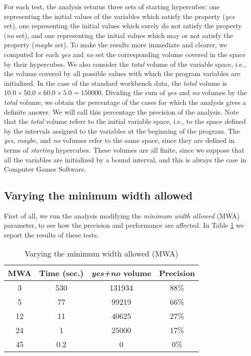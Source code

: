 For each test, the analysis returns three sets of starting hypercubes: one representing the initial values of the variables which satisfy the property (\textit{yes} set), one representing the initial values which surely do not satisfy the property (\textit{no} set), and one representing the initial values which may or not satisfy the property (\textit{maybe} set). To make the results more immediate and clearer, we computed for each \emph{yes} and \emph{no} set the corresponding volume covered in the space by their hypercubes. We also consider the \emph{total} volume of the variable space, i.e., the volume covered by all possible values with which the program variables are initialized. In the case of the standard workbench data, the \emph{total} volume is $10.0 \times 50.0 \times 60.0 \times 5.0 = 150000$. Dividing the sum of \emph{yes} and \emph{no} volumes by the \emph{total} volume, we obtain the percentage of the cases for which the analysis gives a definite answer. We will call this percentage the precision of the analysis. 
Note that the \emph{total} volume refers to the initial variable space, i.e., to the space defined by the intervals assigned to the variables at the beginning of the program. The \emph{yes}, \emph{maybe}, and \emph{no} volumes refer to the same space, since they are defined in terms of \emph{starting} hypercubes. These volumes are all finite, since we suppose that all the variables are initialized by a bound interval, and this is always the case in Computer Games Software.

\subsection{Varying the minimum width allowed}

First of all, we run the analysis modifying the \emph{minimum width allowed} (MWA) parameter, to see how the precision and performance are affected. In Table \ref{table:minWidthAllowed} we report the results of these tests. 

\begin{table}[ht]
\caption{Varying the minimum width allowed (MWA)}
\centering 
\begin{tabular}{| c | c | c | c |}
\hline
MWA & Time (sec.) & \emph{yes+no} volume & Precision \\ \hline
3 & 530 & 131934 & 88\%  \\ %
5 & 77 & 99219 & 66\%  \\ %
12 & 11 & 40625 & 27\%  \\ %
24 & 1 & 25000 & 17\% \\ %
45 & 0.2 & 0 & 0\% \\ \hline 
\end{tabular}
\label{table:minWidthAllowed} 
\end{table}

